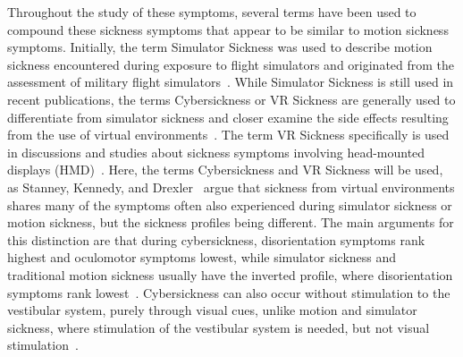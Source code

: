 Throughout the study of these symptoms, several terms have been used to compound these sickness symptoms that appear
to be similar to motion sickness symptoms.
Initially, the term Simulator Sickness was used to describe motion sickness encountered during exposure to flight
simulators and originated from the assessment of military flight simulators~\cite{Saredakis2020, Kennedy1993}.
While Simulator Sickness is still used in recent publications, the terms Cybersickness or VR Sickness are generally used
to differentiate from simulator sickness and closer examine the side effects resulting from the use of virtual
environments~\cite{Saredakis2020,McCauley1992}.
The term VR Sickness specifically is used in discussions and studies about sickness symptoms involving head-mounted
displays (HMD)~\cite{Kim2018,Cobb1999}.
Here, the terms Cybersickness and VR Sickness will be used, as Stanney, Kennedy, and Drexler~\cite{Stanney1997} argue
that sickness from virtual environments shares many of the symptoms often also experienced during simulator sickness
or motion sickness, but the sickness profiles being different.
The main arguments for this distinction are that during cybersickness, disorientation symptoms rank highest and
oculomotor symptoms lowest, while simulator sickness and traditional motion sickness usually have the inverted
profile, where disorientation symptoms rank lowest~\cite{Stanney1997}.
Cybersickness can also occur without stimulation to the vestibular system, purely through visual cues, unlike motion
and simulator sickness, where stimulation of the vestibular system is needed, but not visual stimulation~\cite{LaViola2000}.
